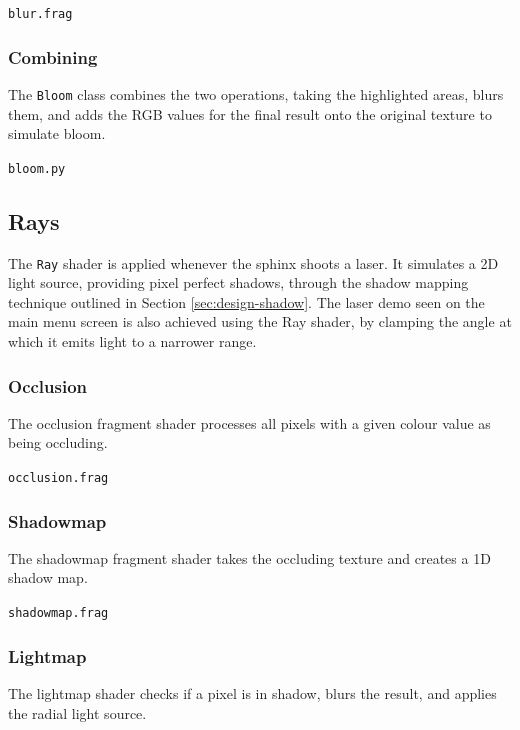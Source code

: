 \documentclass[../main/main.tex]{subfiles}
\begin{document}
\bigskip
\noindent\verb|blur.frag|


\subsubsection*{Combining}
The \lstinline{Bloom} class combines the two operations, taking the highlighted areas, blurs them, and adds the RGB values for the final result onto the original texture to simulate bloom.

\noindent\verb|bloom.py|


\subsection{Rays}
\label{sec:shader-rays}
The \lstinline{Ray} shader is applied whenever the sphinx shoots a laser. It simulates a 2D light source, providing pixel perfect shadows, through the shadow mapping technique outlined in Section \ref{sec:design-shadow}. The laser demo seen on the main menu screen is also achieved using the Ray shader, by clamping the angle at which it emits light to a narrower range.

\subsubsection*{Occlusion}
The occlusion fragment shader processes all pixels with a given colour value as being occluding.

\noindent\verb|occlusion.frag|


\subsubsection*{Shadowmap}
The shadowmap fragment shader takes the occluding texture and creates a 1D shadow map.

\noindent\verb|shadowmap.frag|


\subsubsection*{Lightmap}
The lightmap shader checks if a pixel is in shadow, blurs the result, and applies the radial light source.
\end{document}

